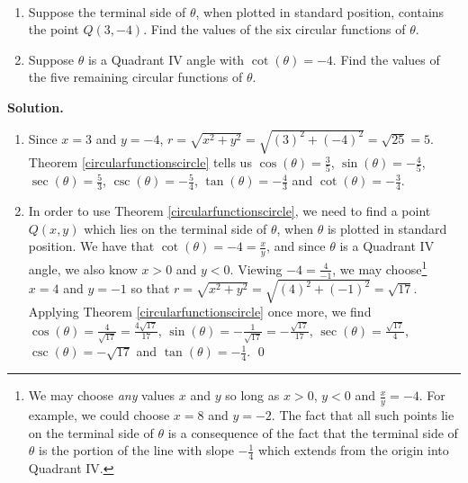 \begin{ex} \label{circularfunctionscircleex} $~$

\begin{enumerate}

\item  Suppose the terminal side of $\theta$, when plotted in standard position, contains the point $Q(3,-4)$.  Find the values of the six circular functions of $\theta$.

\item  Suppose $\theta$ is a Quadrant IV angle with $\cot(\theta) = -4$.  Find the values of the five remaining circular functions of $\theta$.

\end{enumerate}

{\bf Solution.}

\begin{enumerate}

\item    Since $x = 3$ and $y=-4$, $r = \sqrt{x^2 + y^2} = \sqrt{(3)^2+(-4)^2} = \sqrt{25} = 5$. Theorem \ref{circularfunctionscircle} tells us $\cos(\theta) = \frac{3}{5}$, $\sin(\theta) = -\frac{4}{5}$, $\sec(\theta) = \frac{5}{3}$, $\csc(\theta) = -\frac{5}{4}$, $\tan(\theta) = -\frac{4}{3}$ and $\cot(\theta) = - \frac{3}{4}$.

\item In order to use Theorem \ref{circularfunctionscircle}, we need to find a point $Q(x,y)$ which lies on the terminal side of $\theta$, when $\theta$ is plotted in standard position.  We have that $\cot(\theta) = -4 =  \frac{x}{y}$,  and since $\theta$ is a Quadrant IV angle, we also know $x>0$ and $y< 0$.  Viewing $-4 = \frac{4}{-1}$, we may choose\footnote{We may choose \textit{any} values $x$ and $y$ so long as $x>0$, $y<0$ and $\frac{x}{y} = -4$.  For example, we could choose $x=8$ and $y=-2$.  The fact that all such points lie on the terminal side of $\theta$ is a consequence of the fact that the terminal side of $\theta$ is the portion of the line with slope $-\frac{1}{4}$ which extends from the origin into Quadrant IV.}   $x = 4$ and $y = -1$ so that $r = \sqrt{x^2+y^2} = \sqrt{(4)^2 + (-1)^2} = \sqrt{17}$.  Applying Theorem \ref{circularfunctionscircle} once more, we find $\cos(\theta) = \frac{4}{\sqrt{17}} = \frac{4 \sqrt{17}}{17}$,  $\sin(\theta) =- \frac{1}{\sqrt{17}} = -\frac{\sqrt{17}}{17}$, $\sec(\theta) = \frac{\sqrt{17}}{4}$, $\csc(\theta) = - \sqrt{17}$ and $\tan(\theta) = -\frac{1}{4}$. \qed  

\end{enumerate}

\end{ex}

